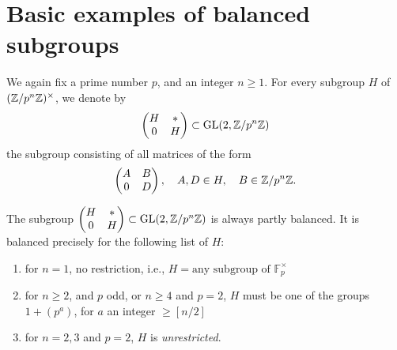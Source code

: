 \section{Basic examples of balanced subgroups}
\label{sec:10.11}

\kmitem\label{item:10.11.1}
We again fix a prime number $p$, and an integer $n \ge 1$. For every subgroup $H$ of $(\mathbb{Z}/p^n\mathbb{Z})^\times$, we denote by
\[
\begin{pmatrix} H & * \\ 0 & H \end{pmatrix} \subset \operatorname{GL}(2, \mathbb{Z}/p^n\mathbb{Z})
\]
the subgroup consisting of all matrices of the form
\[
\begin{pmatrix} A & B \\ 0 & D \end{pmatrix} , \quad A, D \in H, \quad B \in \mathbb{Z}/p^n\mathbb{Z} .
\]

\begin{kprop}\label{prop:10.11.2}
The subgroup $\begin{pmatrix} H & * \\ 0 & H \end{pmatrix} \subset \operatorname{GL}(2, \mathbb{Z}/p^n\mathbb{Z})$ is always partly balanced. It is balanced precisely for the following list of $H$:
\begin{enumerate}[label=(\arabic*)]
\item for $n = 1$, no restriction, i.e., $H = \text{any subgroup of } \mathbb{F}_p^\times$
\item for $n \ge 2$, and $p$ odd, or $n \ge 4$ and $p = 2$, $H$ must be one of the groups $1 + (p^a)$, for $a$ an integer $\ge [n/2]$
\item for $n = 2, 3$ and $p = 2$, $H$ is \emph{unrestricted}.
\end{enumerate}
\end{kprop}

